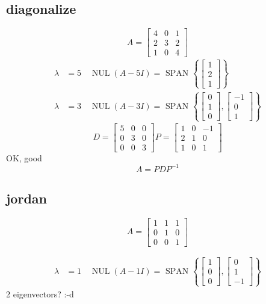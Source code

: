 \documentclass[a4paper]{article}
\begin{document}
\subsection*{diagonalize}
\label{sec-5-1}
$$
A=\left[\begin{array}{lll}{4} & {0} & {1} \\ {2} & {3} & {2} \\ {1} & {0} & {4}\end{array}\right]
$$
\begin{align*}
\lambda&=5 \quad \operatorname{NUL}(A-5 I) =\text { SPAN }\left\{\left[\begin{array}{l}{1} \\ {2} \\ {1}\end{array}\right]\right\} \\
\lambda&=3 \quad \operatorname{NUL}(A-3 I) = \text { SPAN }\left\{\left[\begin{array}{l}{0} \\ {1} \\ {0}\end{array}\right],\left[\begin{array}{c}{-1} \\ {0} \\ {1}\end{array}\right]\right\}
\end{align*}
$$
D=\left[\begin{array}{lll}{5} & {0} & {0} \\ {0} & {3} & {0} \\ {0} & {0} & {3}\end{array}\right]
P=\left[\begin{array}{llc}{1} & {0} & {-1} \\ {2} & {1} & {0} \\ {1} & {0} & {1}\end{array}\right]
$$
OK, good
$$
A=P D P^{-1}
$$
\subsection*{jordan}
\label{sec-5-2}
$$
A=\left[\begin{array}{lll}{1} & {1} & {1} \\ {0} & {1} & {0} \\ {0} & {0} & {1}\end{array}\right]
$$

\begin{align*}
\lambda&=1 \quad \operatorname{NUL}(A-1 I) = \text { SPAN }\left\{\left[\begin{array}{l}{1} \\ {0} \\ {0}\end{array}\right],\left[\begin{array}{c}{0} \\ {1} \\ {-1}\end{array}\right]\right\}
\end{align*}
2 eigenvectors? :-d
\end{document}
